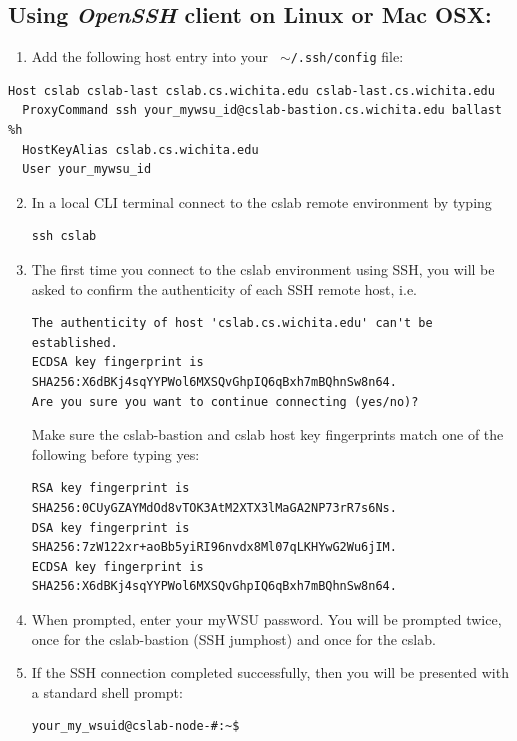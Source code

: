 \documentclass[12pt]{article}
\begin{document}
\subsection*{Using \textit{OpenSSH} client on Linux or Mac OSX:}
\begin{enumerate}
  \item Add the following host entry into your \texttt{ $\sim$/.ssh/config} file:
\end{enumerate}
\begin{verbatim}
Host cslab cslab-last cslab.cs.wichita.edu cslab-last.cs.wichita.edu
  ProxyCommand ssh your_mywsu_id@cslab-bastion.cs.wichita.edu ballast %h
  HostKeyAlias cslab.cs.wichita.edu
  User your_mywsu_id
\end{verbatim}
\begin{enumerate}
\setcounter{enumi}{1}
\item In a local CLI terminal connect to the cslab remote environment by typing
\begin{verbatim}
ssh cslab
\end{verbatim}
\item The first time you connect to the cslab environment using SSH, you will be asked to confirm the authenticity of each SSH remote host, i.e.
\begin{verbatim}
The authenticity of host 'cslab.cs.wichita.edu' can't be established.
ECDSA key fingerprint is
SHA256:X6dBKj4sqYYPWol6MXSQvGhpIQ6qBxh7mBQhnSw8n64.
Are you sure you want to continue connecting (yes/no)?
\end{verbatim}

Make sure the cslab-bastion and cslab host key fingerprints match one of the following before typing yes:
\begin{verbatim}
RSA key fingerprint is
SHA256:0CUyGZAYMdOd8vTOK3AtM2XTX3lMaGA2NP73rR7s6Ns.
DSA key fingerprint is
SHA256:7zW122xr+aoBb5yiRI96nvdx8Ml07qLKHYwG2Wu6jIM.
ECDSA key fingerprint is
SHA256:X6dBKj4sqYYPWol6MXSQvGhpIQ6qBxh7mBQhnSw8n64.
\end{verbatim}

\item When prompted, enter your myWSU password. You will be prompted twice, once for the cslab-bastion (SSH jumphost) and once for the cslab.
\item If the SSH connection completed successfully, then you will be presented with a standard shell prompt:
\begin{verbatim}
your_my_wsuid@cslab-node-#:~$
\end{verbatim}
\end{enumerate}
\end{document}
